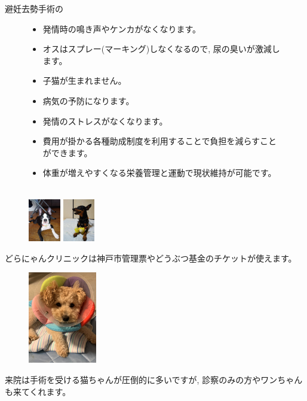 \documentclass{jsarticle}
\begin{document}
\newpage


\huge

	避妊去勢手術の
\Large
	\begin{figure}[htbp]
		\Large
		\centering
		\begin{minipage}{0.4\columnwidth}
			\Large
			\begin{itemize}
				\item 発情時の鳴き声やケンカがなくなります。
				\item オスはスプレー(マーキング)しなくなるので, 尿の臭いが激減します。
				\item 子猫が生まれません。
				\item 病気の予防になります。
				\item 発情のストレスがなくなります。
			\end{itemize}
		\end{minipage}
		\hspace{10pt}
		\begin{minipage}{0.4\columnwidth}
			\Large
			\begin{itemize}
				\item 費用が掛かる各種助成制度を利用することで負担を減らすことができます。
				\item 体重が増えやすくなる栄養管理と運動で現状維持が可能です。 \\\\
			\end{itemize}
		\end{minipage}
	\end{figure}

	\begin{figure}
		\includegraphics[width=1.4cm]{6.jpg}
		\includegraphics[width=1.4cm]{7.jpg}
	\end{figure}
	どらにゃんクリニックは神戸市管理票やどうぶつ基金のチケットが使えます。

	\vspace{30pt}
	\begin{figure}
		\vspace*{-\intextsep}
		\includegraphics[width=3cm]{5.jpg}
	\end{figure}
	来院は手術を受ける猫ちゃんが圧倒的に多いですが, 診察のみの方やワンちゃんも来てくれます。
\end{document}
